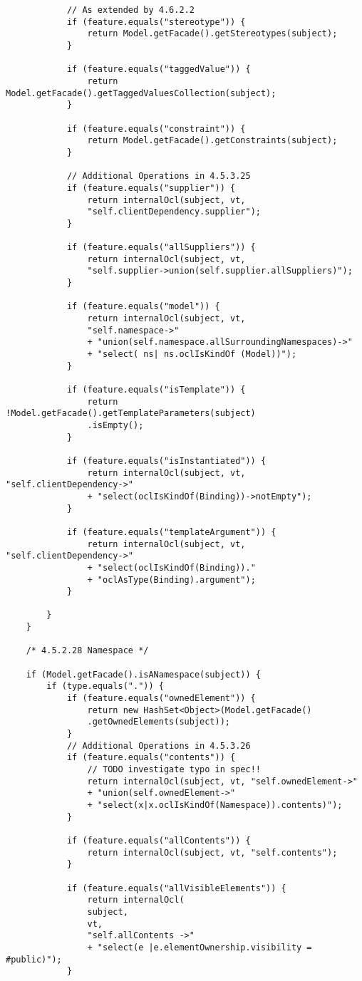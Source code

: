 \begin{mdframed}
\begin{lstlisting}
			// As extended by 4.6.2.2
			if (feature.equals("stereotype")) {
				return Model.getFacade().getStereotypes(subject);
			}
			
			if (feature.equals("taggedValue")) {
				return Model.getFacade().getTaggedValuesCollection(subject);
			}
			
			if (feature.equals("constraint")) {
				return Model.getFacade().getConstraints(subject);
			}
			
			// Additional Operations in 4.5.3.25
			if (feature.equals("supplier")) {
				return internalOcl(subject, vt,
				"self.clientDependency.supplier");
			}                                
			
			if (feature.equals("allSuppliers")) {
				return internalOcl(subject, vt,
				"self.supplier->union(self.supplier.allSuppliers)");
			}
			
			if (feature.equals("model")) {
				return internalOcl(subject, vt,
				"self.namespace->"
				+ "union(self.namespace.allSurroundingNamespaces)->"
				+ "select( ns| ns.oclIsKindOf (Model))");
			}
			
			if (feature.equals("isTemplate")) {
				return !Model.getFacade().getTemplateParameters(subject)
				.isEmpty();
			}
			
			if (feature.equals("isInstantiated")) {
				return internalOcl(subject, vt, "self.clientDependency->"
				+ "select(oclIsKindOf(Binding))->notEmpty");
			}
			
			if (feature.equals("templateArgument")) {
				return internalOcl(subject, vt, "self.clientDependency->"
				+ "select(oclIsKindOf(Binding))."
				+ "oclAsType(Binding).argument");
			}
			
		}
	}
	
	/* 4.5.2.28 Namespace */          
	
	if (Model.getFacade().isANamespace(subject)) {
		if (type.equals(".")) {
			if (feature.equals("ownedElement")) {
				return new HashSet<Object>(Model.getFacade()
				.getOwnedElements(subject));
			}
			// Additional Operations in 4.5.3.26
			if (feature.equals("contents")) {
				// TODO investigate typo in spec!!
				return internalOcl(subject, vt, "self.ownedElement->"
				+ "union(self.ownedElement->" 
				+ "select(x|x.oclIsKindOf(Namespace)).contents)");
			}
			
			if (feature.equals("allContents")) {
				return internalOcl(subject, vt, "self.contents");
			}
			
			if (feature.equals("allVisibleElements")) {
				return internalOcl(
				subject,
				vt,
				"self.allContents ->"
				+ "select(e |e.elementOwnership.visibility = #public)");
			}
			

\end{lstlisting}
\end{mdframed}
